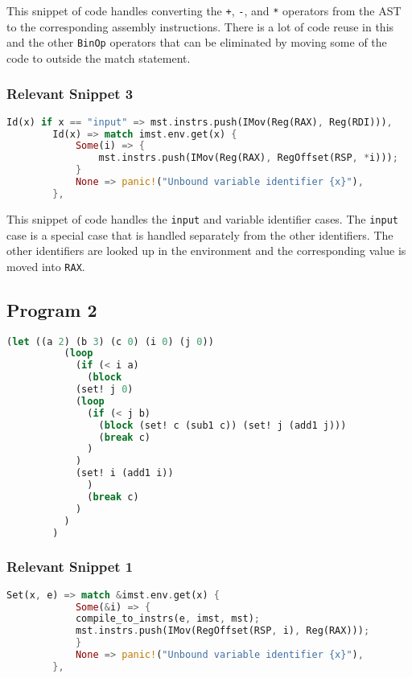 	This snippet of code handles converting the \verb|+|, \verb|-|, and \verb|*| operators from the AST to the corresponding assembly instructions. There is a lot of code reuse in this and the other \verb|BinOp| operators that can be eliminated by moving some of the code to outside the match statement.

	\subsubsection{Relevant Snippet 3}

	\begin{lstlisting}[language=Rust, title=Relevant snippet 3: from \texttt{src/main.rs}, float, floatplacement=H]
        Id(x) if x == "input" => mst.instrs.push(IMov(Reg(RAX), Reg(RDI))),
        Id(x) => match imst.env.get(x) {
            Some(i) => {
                mst.instrs.push(IMov(Reg(RAX), RegOffset(RSP, *i)));
            }
            None => panic!("Unbound variable identifier {x}"),
        },
	\end{lstlisting}

	This snippet of code handles the \verb|input| and variable identifier cases. The \verb|input| case is a special case that is handled separately from the other identifiers. The other identifiers are looked up in the environment and the corresponding value is moved into \verb|RAX|.

	\pagebreak
	\subsection{Program 2}
	\begin{lstlisting}[language=lisp, title=\texttt{example2.snek}]
		(let ((a 2) (b 3) (c 0) (i 0) (j 0))
		  (loop
		    (if (< i a)
		      (block
			(set! j 0)
			(loop
			  (if (< j b)
			    (block (set! c (sub1 c)) (set! j (add1 j)))
			    (break c)
			  )
			)
			(set! i (add1 i))
		      )
		      (break c)
		    )
		  )
		)
	\end{lstlisting}

	\subsubsection{Relevant Snippet 1}

	\begin{lstlisting}[language=Rust, title=from \texttt{src/main.rs}]
		Set(x, e) => match &imst.env.get(x) {
		    Some(&i) => {
			compile_to_instrs(e, imst, mst);
			mst.instrs.push(IMov(RegOffset(RSP, i), Reg(RAX)));
		    }
		    None => panic!("Unbound variable identifier {x}"),
		},
	\end{lstlisting}


